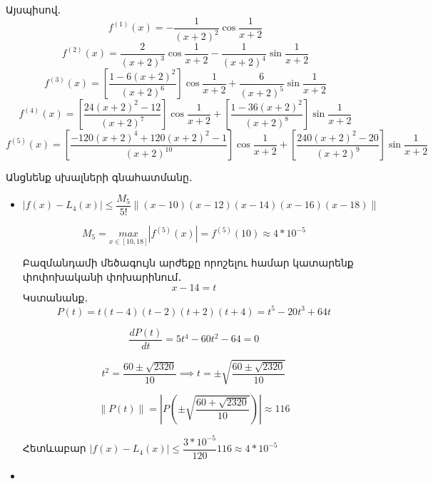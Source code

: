 \documentclass{article}
\begin{document}
\begin{enumerate}
	Այսպիսով․
					$$f^{\left( 1\right)}\left(x\right) = -\dfrac{1}{\left(x+2\right)^{2}} \cos\dfrac{1}{x + 2}$$
					$$f^{\left( 2\right)}\left(x\right) = \dfrac{2}{\left(x+2\right)^{3}} \cos\dfrac{1}{x + 2} - \dfrac{1}{\left(x+2\right)^{4}}\sin\dfrac{1}{x + 2}$$		
					$$f^{\left( 3\right)}\left(x\right) = \left[\dfrac{1-6\left(x+2\right)^2}{\left(x+2\right)^6}\right]  \cos\dfrac{1}{x + 2} + \dfrac{6}{\left(x+2\right)^{5}}  \sin\dfrac{1}{x + 2}$$		
					$$f^{\left( 4\right)}\left(x\right) = \left[\dfrac{24 \left(x+2\right)^{2} - 12}{\left(x+2\right)^{7}}\right] \cos\dfrac{1}{x + 2} + 
		\left[\dfrac{1 - 36 \left(x+2\right)^{2}}{\left(x+2\right)^{8}} \right] \sin\dfrac{1}{x + 2}$$
					$$f^{\left( 5\right)}\left(x\right) =\left[\dfrac{-120 \left(x+2\right)^{4} + 120 \left(x+2\right)^{2} - 1 }{\left(x+2\right)^{10}}\right] \cos\dfrac{1}{x + 2} + 
\left[\dfrac{240 \left(x+2\right)^{2} - 20 }{\left(x+2\right)^{9}}\right] \sin\dfrac{1}{x + 2} $$

		
	Անցնենք սխալների գնահատմանը․


\begin{itemize}

\item
	
	$|f\left(x\right) - L_{4}\left(x\right)| \leq \dfrac{M_{5}}{5!} \lVert \left(x - 10\right)\left(x - 12\right)\left(x - 14\right)\left(x - 16\right)\left(x - 18\right) \rVert$

	$$M_{5} = \underset{x \in \left[10, 18\right]}{max}\left|f^{\left(5\right)}\left(x\right)\right| = f^{\left(5\right)}\left(10\right) \approx 4 * 10^{-5}$$




	Բազմանդամի մեծագույն արժեքը որոշելու համար կատարենք փոփոխականի փոխարինում․
												$$x - 14 = t$$
	Կստանանք․
				$$P\left(t\right) = t \left(t-4\right) \left(t-2\right) \left(t+2\right) \left(t+4\right) = t^{5} - 20 t^{3} + 64t$$

				$$ \dfrac{d P\left(t\right)}{dt} = 5 t^{4} - 60 t^{2} - 64 = 0$$
				
				$$t^{2} = \dfrac{60 \pm \sqrt{2320}}{10} \implies t = \pm \sqrt{\dfrac{60 \pm \sqrt{2320}}{10}} $$

				$$\lVert P\left(t\right) \rVert = \left|P\left( \pm  \sqrt{\dfrac{60 + \sqrt{2320}}{10}}   \right)\right| \approx 116$$

				Հետևաբար $|f\left(x\right) - L_{4}\left(x\right)| \leq \dfrac{3 * 10^{-5}}{120} 116 \approx 4 * 10^{-5}$

\item


\end{itemize}
\end{enumerate}
\end{document}
